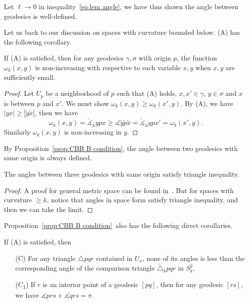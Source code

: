 Let $\ell\to 0$ in inequality~\eqref{eq:lem angle}, we have thus shown the angle between geodesics is well-defined.

Let us back to our discussion on spaces with curvature bounded below.
(A) has the following corollary.
\begin{prop}\label{prop:CBB B condition}
    If {\rm (A)} is satisfied, then for any geodesics $\gamma,\sigma$ with origin $p$, the function $\omega_k(x,y)$ is non-increasing with respective to each variable $x,y$ when $x,y$ are sufficiently small.
\end{prop}
\begin{proof}
    Let $U_p$ be a neighborhood of $p$ such that (A) holds, $x,x'\in\gamma$, $y\in\sigma$ and $x$ is between $p$ and $x'$.
    We must show $\omega_k(x,y)\geq\omega_k(x',y)$.
    By (A), we have $|yx|\geq|\tilde{y}\tilde{x}|$, then we have
    \[\omega_k(x,y)=\tilde{\measuredangle}_kypx\geq\measuredangle{\tilde{y}\tilde{p}\tilde{x}}=\tilde{\measuredangle}_kypx'=\omega_k(x',y).\]
    Similarly $\omega_k(x,y)$ is non-increasing in $y$.
\end{proof}

By Proposition~\ref{prop:CBB B condition}, the angle between two geodesics with same origin is always defined.

\begin{prop}\label{prop:angle triangle inequality}
    The angles between three geodesics with same origin satisfy triangle inequality.
\end{prop}
\begin{proof}
    A proof for general metric space can be found in~\cite[6.5]{alexanderAlexandrovGeometry2024}.
    But for spaces with curvature $\geq k$, notice that angles in space form satisfy triangle inequality, and then we can take the limit.
\end{proof}

Proposition~\ref{prop:CBB B condition}~also has the following direct corollaries.
\begin{cor}\label{cor:CBB condition C}
    If {\rm (A)} is satisfied, then
    \begin{itemize}
        \item[\rm (C)] For any triangle $\triangle{pqr}$ contained in $U_x$, none of its angles is less than the corresponding angle of the comparison triangle $\tilde{\triangle}_kpqr$ in $S^2_k$.
        \item[\rm (C\textsubscript{1})] If $r$ is an interior point of a geodesic $[pq]$, then for any geodesic $[rs]$, we have $\measuredangle{prs}+\measuredangle{qrs}=\pi$. 
    \end{itemize}
\end{cor}

